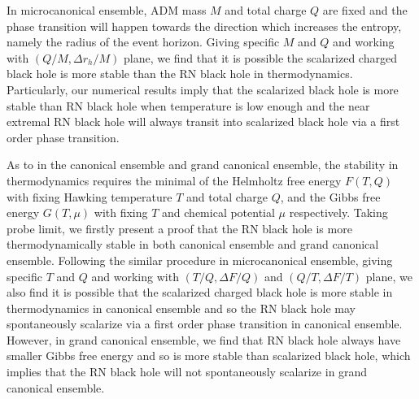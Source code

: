 \documentclass[pr, twocolumn, preprintnumbers, showpacs,footnoteadded, superscriptaddress,nofootinbib,longbibliography]{revtex4-1}
\begin{document}
In microcanonical ensemble, ADM mass $M$ and total charge $Q$ are fixed and the phase transition will happen towards the direction which increases the entropy, namely the radius of the event horizon. Giving specific $M$ and $Q$ and working with $(Q/M,\Delta r_h/M)$ plane, we find that it is possible the scalarized charged black hole is more stable than the RN black hole in thermodynamics. Particularly, our numerical results imply that the scalarized black hole is more stable than RN black hole when temperature is low enough and the near extremal RN black hole will always transit into scalarized black hole via a first order phase transition.

As to in the canonical ensemble and grand canonical ensemble, the stability in thermodynamics requires the minimal of the Helmholtz free energy $F(T, Q)$ with fixing Hawking temperature $T$ and total charge $Q$, and the Gibbs free energy $G(T,\mu)$ with fixing $T$ and chemical potential $\mu$ respectively. Taking probe limit, we firstly present a proof that the RN black hole is more thermodynamically stable in both canonical ensemble and grand canonical ensemble. Following the similar procedure in microcanonical ensemble, giving specific $T$ and $Q$ and working with $(T/Q, \Delta F/Q)$ and $(Q/T, \Delta F / T)$ plane, we also find it is possible that the scalarized charged black hole is more stable in thermodynamics in canonical ensemble and so the RN black hole may  spontaneously scalarize via a first order phase transition in canonical ensemble. However, in grand canonical ensemble, we find that RN black hole always have smaller Gibbs free energy and so is more stable than scalarized black hole, which implies that the RN black hole will not spontaneously scalarize in grand canonical ensemble.
\end{document}

